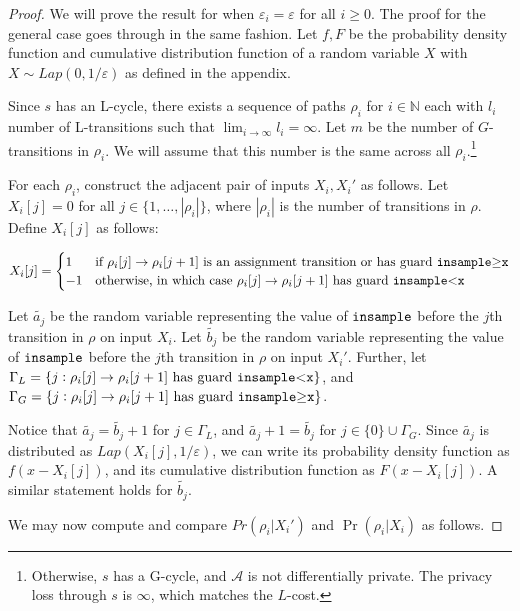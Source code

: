 \documentclass{article}
\newcommand{\N}{\mathbb{N}}
\renewcommand{\epsilon}{\varepsilon}
\newcommand{\insamplegeqx}{\textup{\texttt{insample$\geq$x}}}
\newcommand{\insampleltx}{\textup{\texttt{insample$<$x}}}
\newcommand{\insample}{\textup{\texttt{insample}}}
\begin{document}
\begin{proof}
    We will prove the result for when $\epsilon_i = \epsilon$ for all $i \geq 0$. The proof for the general case goes through in the same fashion. Let $f, F$ be the probability density function and cumulative distribution function of a random variable $X$ with $X \sim Lap(0, 1/\epsilon)$ as defined in the appendix. 

    Since $s$ has an L-cycle, there exists a sequence of paths $\rho_i$ for $i \in \N$ each with $l_i$ number of L-transitions such that $\lim_{i \to \infty} l_i = \infty$. Let $m$ be the number of $G$-transitions in $\rho_i$. We will assume that this number is the same across all $\rho_i$.\footnote{Otherwise, $s$ has a G-cycle, and $\mathcal{A}$ is not differentially private. The privacy loss through $s$ is $\infty$, which matches the $L$-cost.}
    
    For each $\rho_i$, construct the adjacent pair of inputs $X_i, X_i'$ as follows. Let $X_i[j] = 0$ for all $j \in \{1, \dots, |\rho_i|\}$, where $|\rho_i|$ is the number of transitions in $\rho$. Define $X_i[j]$ as follows:

    \[X_i[j] = \begin{cases}
        1 & \text{if } \rho_i[j] \to \rho_i[j + 1] \text{ is an assignment transition or has guard \insamplegeqx} \\
        -1 & \text{otherwise, in which case } \rho_i[j] \to \rho_i[j + 1] \text{ has guard \insampleltx}\\
    \end{cases}\]

    Let $\tilde{a_j}$ be the random variable representing the value of $\insample$ before the $j$th transition in $\rho$ on input $X_i$. Let $\tilde{b_j}$ be the random variable representing the value of $\insample$ before the $j$th transition in $\rho$ on input $X_i'$. Further, let $\Gamma_L = \{j : \rho_i[j] \to \rho_i[j + 1] \text{ has guard } \insampleltx\}$, and $\Gamma_G = \{j : \rho_i[j] \to \rho_i[j + 1] \text{ has guard } \insamplegeqx\}$. 
    
    Notice that $\tilde{a_j} = \tilde{b_j} + 1$ for $j \in \Gamma_L$, and $\tilde{a_j} + 1 = \tilde{b_j}$ for $j \in \{0\} \cup \Gamma_G$. Since $\tilde{a_j}$ is distributed as $Lap(X_i[j], 1/\epsilon)$, we can write its probability density function as $f(x - X_i[j])$, and its cumulative distribution function as $F(x - X_i[j])$. A similar statement holds for $\tilde{b_j}$.
    
    We may now compute and compare $Pr(\rho_i | X_i')$ and $\Pr(\rho_i | X_i)$ as follows.


\end{proof}
\end{document}
